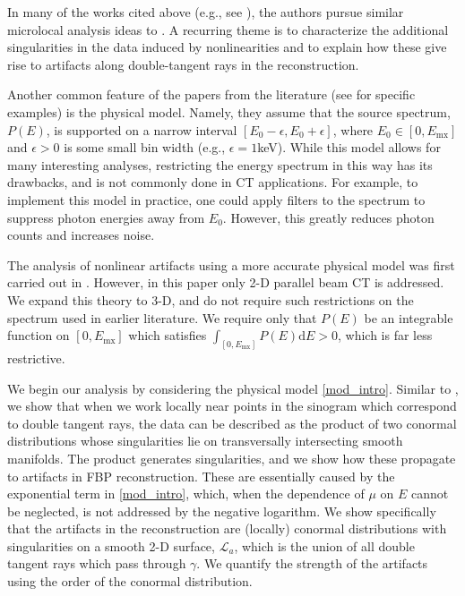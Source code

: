 \documentclass[11pt]{article}
\newcommand{\e}{\epsilon}
\numberwithin{equation}{section}
\theoremstyle{definition}
\begin{document}
{In {many of the works} cited above {(e.g., see \cite{park2017characterization, wang2024identification, wang2021streak}),} the authors pursue similar microlocal analysis ideas {to \cite{palacios2018quantitative,chihara2024geodesic}.} A recurring theme is to characterize the additional singularities in the data induced by nonlinearities and to explain how these give rise to artifacts along double-tangent rays in the reconstruction.}

{Another common feature of {the papers from the literature (see \cite{park2017characterization, palacios2018quantitative, wang2021streak, wang2024identification, chihara2022microlocal, chihara2024geodesic} for specific examples)} is the physical model.} {Namely,} they assume that the source spectrum, $P(E)$, is supported on a narrow interval $[E_0 - \e, E_0 +\e]$, where $E_0 \in [0,E_{\text{mx}}]$ and $\e > 0$ is some small bin width (e.g., $\e = 1$keV).  While this model allows for many interesting analyses, restricting the energy spectrum in this way has its drawbacks, and is not commonly done {in CT applications.} For example, to implement this model in practice, one could apply filters to the spectrum to suppress photon energies away from $E_0$. However, this greatly reduces photon counts and increases noise. 

The analysis of nonlinear artifacts using a more accurate physical model was first carried out in \cite{katsevich2026}. However, in this paper only 2-D parallel beam CT is addressed. We expand this theory to 3-D, and do not require such restrictions on the spectrum used in earlier literature. We require only that $P(E)$ be an integrable function on $[0,E_{\text{mx}}]$ which satisfies $\int_{[0,E_{\text{mx}}]} P(E) \mathrm{d}E > 0$, which is far less restrictive. 

We begin our analysis by considering the physical model \eqref{mod_intro}. Similar to \cite{palacios2018quantitative, chihara2024geodesic, katsevich2026,palamodov1986nonlinear,palamodov1990some,park2017characterization,chihara2022microlocal, wang2024identification, wang2021streak}, we show that when we work locally near points in the sinogram which correspond to double tangent rays, the data can be described as the product of two conormal distributions whose singularities lie on transversally intersecting smooth manifolds. The product generates singularities, and we show how these propagate to artifacts in FBP reconstruction. These are essentially caused by the exponential term in \eqref{mod_intro}, which, when the dependence of $\mu$ on $E$ cannot be neglected, is not addressed by the negative logarithm. We show specifically that the artifacts in the reconstruction are (locally) conormal distributions with singularities on a smooth 2-D surface, $\mathcal{L}_a$, which is the union of all double tangent rays which pass through $\gamma$. We quantify the strength of the artifacts using the order of the conormal distribution. 
\end{document}
